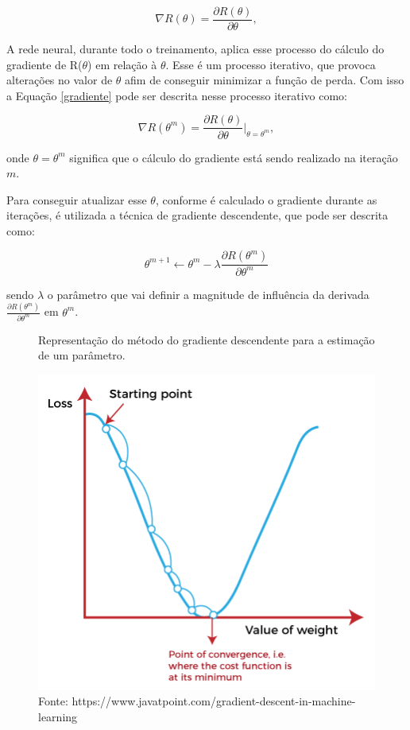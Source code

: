 \begin{equation}
\nabla R(\theta) = \frac{\partial R(\theta)}{\partial \theta},     
\label{gradiente}
\end{equation}


A rede neural, durante todo o treinamento, aplica esse processo do cálculo do gradiente de R(\textbf{$\theta$}) 
em relação à \textbf{$\theta$}. Esse é um processo iterativo, que provoca alterações no valor de $\theta$ afim de 
conseguir minimizar a função de perda. Com isso a Equação \ref{gradiente} pode ser descrita nesse processo iterativo como:

\[
\nabla R(\theta^m) = \frac{\partial R(\theta)}{\partial \theta} \bigg\rvert_{\theta = \theta^m},
\]

\hspace{-1.5cm}onde $\theta = \theta^m$ significa que o cálculo do gradiente está sendo realizado na iteração $m$.

Para conseguir atualizar esse $\theta$, conforme é calculado o gradiente durante as iterações, é utilizada a técnica de gradiente descendente, que pode ser descrita como: 

\[
\theta^{m+1} \leftarrow \theta^{m} - \lambda\frac{\partial R(\theta^m)}{\partial \theta^m}
\]

\hspace{-1.5cm}sendo $\lambda$ o parâmetro que vai definir a magnitude de influência da derivada  $\frac{\partial R(\theta^m)}{\partial \theta^m}$ em $\theta^{m}$.

\begin{figure}[H]
    \centering
    \caption{Representação do método do gradiente descendente para a estimação de um parâmetro.}
    \includegraphics[scale=0.7]{imagens/gradient_descent.png}
    \caption*{Fonte: https://www.javatpoint.com/gradient-descent-in-machine-learning}
    \label{fig:gradient_descent}
    
\end{figure}

